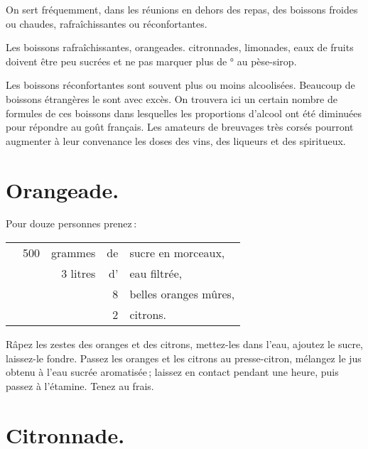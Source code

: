 \sk

\bigskip

On sert fréquemment, dans les réunions en dehors des repas, des boissons
froides ou chaudes, rafraîchissantes ou réconfortantes.

Les boissons rafraîchissantes, orangeades. citronnades, limonades, eaux de
fruits doivent être peu sucrées et ne pas marquer plus de {\mmm}° au
pèse-sirop.

Les boissons réconfortantes sont souvent plus ou moins alcoolisées. Beaucoup de
boissons étrangères le sont avec excès. On trouvera ici un certain nombre de
formules de ces boissons dans lesquelles les proportions d'alcool ont été
diminuées pour répondre au goût français. Les amateurs de breuvages très corsés
pourront augmenter à leur convenance les doses des vins, des liqueurs et des
spiritueux.

\section*{\centering Orangeade.}
{}

Pour douze personnes prenez :

\footnotesize
\begin{longtable}{rrrrp{16em}}
  & 500 & grammes & de & sucre en morceaux,                                                               \\
  & \multicolumn{2}{r}{3 litres} & d' & eau filtrée,                                                      \\
  &     &         &  8 & belles oranges mûres,                                                            \\
  &     &         &  2 & citrons.                                                                         \\
\end{longtable}
\normalsize

Râpez les zestes des oranges et des citrons, mettez-les dans l'eau, ajoutez le
sucre, laissez-le fondre. Passez les oranges et les citrons au presse-citron,
mélangez le jus obtenu à l'eau sucrée aromatisée ; laissez en contact pendant
une heure, puis passez à l'étamine. Tenez au frais.

\section*{\centering Citronnade.}
{}

